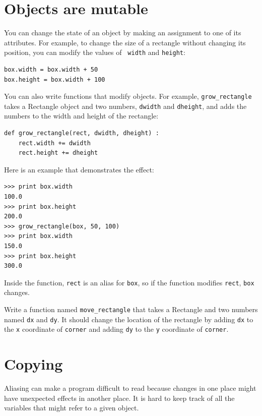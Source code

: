 \documentclass[10pt]{book}
\begin{document}
\section{Objects are mutable}


You can change the state of an object by making an assignment to one of
its attributes.  For example, to change the size of a rectangle
without changing its position, you can modify the values of {\tt
width} and {\tt height}:

\beforeverb
\begin{verbatim}
box.width = box.width + 50
box.height = box.width + 100
\end{verbatim}
\afterverb
%
You can also write functions that modify objects.  For example,
\verb"grow_rectangle" takes a Rectangle object and two numbers,
{\tt dwidth} and {\tt dheight}, and adds the numbers to the
width and height of the rectangle:

\beforeverb
\begin{verbatim}
def grow_rectangle(rect, dwidth, dheight) :
    rect.width += dwidth
    rect.height += dheight
\end{verbatim}
\afterverb
%
Here is an example that demonstrates the effect:

\beforeverb
\begin{verbatim}
>>> print box.width
100.0
>>> print box.height
200.0
>>> grow_rectangle(box, 50, 100)
>>> print box.width
150.0
>>> print box.height
300.0
\end{verbatim}
\afterverb
%
Inside the function, {\tt rect} is an
alias for {\tt box}, so if the function modifies {\tt rect}, 
{\tt box} changes.

\begin{ex}
Write a function named \verb"move_rectangle" that takes
a Rectangle and two numbers named {\tt dx} and {\tt dy}.  It
should change the location of the rectangle by adding {\tt dx}
to the {\tt x} coordinate of {\tt corner} and adding {\tt dy}
to the {\tt y} coordinate of {\tt corner}.
\end{ex}


\section{Copying}


Aliasing can make a program difficult to read because changes
in one place might have unexpected effects in another place.
It is hard to keep track of all the variables that might refer
to a given object.
\end{document}
